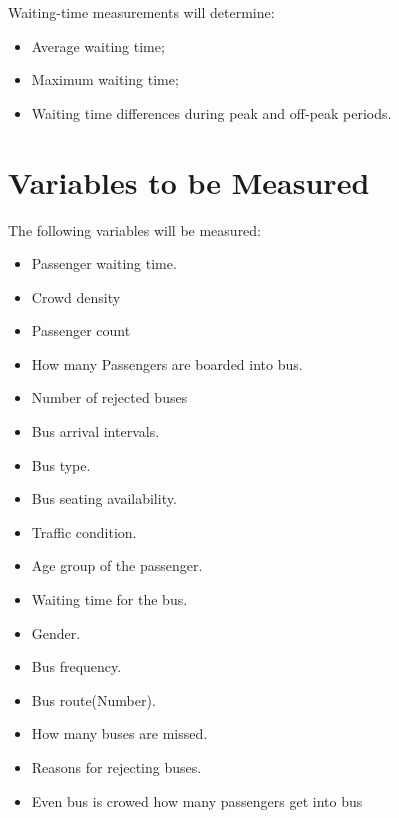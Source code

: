 \documentclass[12pt,a4paper]{report}
\begin{document}
Waiting-time measurements will determine:

\begin{itemize}[noitemsep]

\item Average waiting time;

\item Maximum waiting time;

\item Waiting time differences during peak and off-peak periods.

\end{itemize}





\section{Variables to be Measured}

The following variables will be measured:

\begin{itemize}[noitemsep]

\item Passenger waiting time.
\item Crowd density
\item Passenger count
\item How many Passengers are boarded into bus.
\item Number of rejected buses
\item Bus arrival intervals.
\item Bus type.
\item Bus seating availability.
\item Traffic condition.
\item Age group of the passenger.
\item Waiting time for the bus.
\item Gender.
\item Bus frequency.
\item Bus route(Number).
\item How many buses are missed.
\item Reasons for rejecting buses.
\item Even bus is crowed how many passengers get into bus




\end{itemize}

\end{document}
